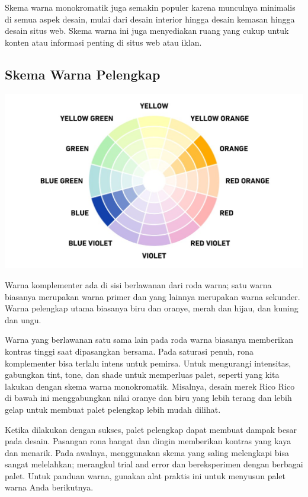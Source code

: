 \documentclass[a4paper]{article}
\begin{document}
Skema warna monokromatik juga semakin populer karena munculnya minimalis di semua aspek desain, mulai dari desain interior hingga desain kemasan hingga desain situs web. Skema warna ini juga menyediakan ruang yang cukup untuk konten atau informasi penting di situs web atau iklan.

\subsection{Skema Warna Pelengkap}
\begin{center}
  \includegraphics[width=\widthtext]{resources/pelengkap.jpg}
\end{center}
Warna komplementer ada di sisi berlawanan dari roda warna; satu warna biasanya merupakan warna primer dan yang lainnya merupakan warna sekunder. Warna pelengkap utama biasanya biru dan oranye, merah dan hijau, dan kuning dan ungu.

Warna yang berlawanan satu sama lain pada roda warna biasanya memberikan kontras tinggi saat dipasangkan bersama. Pada saturasi penuh, rona komplementer bisa terlalu intens untuk pemirsa. Untuk mengurangi intensitas, gabungkan tint, tone, dan shade untuk memperluas palet, seperti yang kita lakukan dengan skema warna monokromatik. Misalnya, desain merek Rico Rico di bawah ini menggabungkan nilai oranye dan biru yang lebih terang dan lebih gelap untuk membuat palet pelengkap lebih mudah dilihat.

Ketika dilakukan dengan sukses, palet pelengkap dapat membuat dampak besar pada desain. Pasangan rona hangat dan dingin memberikan kontras yang kaya dan menarik. Pada awalnya, menggunakan skema yang saling melengkapi bisa sangat melelahkan; merangkul trial and error dan bereksperimen dengan berbagai palet. Untuk panduan warna, gunakan alat praktis ini untuk menyusun palet warna Anda berikutnya.
\end{document}
